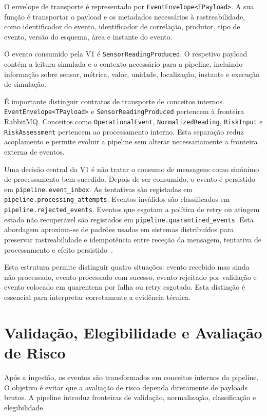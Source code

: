 O envelope de transporte é representado por \texttt{EventEnvelope<TPayload>}. A sua função é transportar o payload e os metadados necessários à rastreabilidade, como identificador do evento, identificador de correlação, produtor, tipo de evento, versão do esquema, área e instante do evento.

O evento consumido pela V1 é \texttt{SensorReadingProduced}. O respetivo payload contém a leitura simulada e o contexto necessário para a pipeline, incluindo informação sobre sensor, métrica, valor, unidade, localização, instante e execução de simulação.

É importante distinguir contratos de transporte de conceitos internos. \texttt{EventEnvelope<TPayload>} e \texttt{SensorReadingProduced} pertencem à fronteira RabbitMQ. Conceitos como \texttt{OperationalEvent}, \texttt{NormalizedReading}, \texttt{RiskInput} e \texttt{RiskAssessment} pertencem ao processamento interno. Esta separação reduz acoplamento e permite evoluir a pipeline sem alterar necessariamente a fronteira externa de eventos.

Uma decisão central da V1 é não tratar o consumo de mensagens como sinónimo de processamento bem-sucedido. Depois de ser consumido, o evento é persistido em \texttt{pipeline.event\_inbox}. As tentativas são registadas em \texttt{pipeline.processing\_attempts}. Eventos inválidos são classificados em \texttt{pipeline.rejected\_events}. Eventos que esgotam a política de retry ou atingem estado não recuperável são registados em \texttt{pipeline.quarantined\_events}. Esta abordagem aproxima-se de padrões usados em sistemas distribuídos para preservar rastreabilidade e idempotência entre receção da mensagem, tentativa de processamento e efeito persistido~\citep{richardson_idempotent_consumer,richardson_transactional_outbox}.

Esta estrutura permite distinguir quatro situações: evento recebido mas ainda não processado, evento processado com sucesso, evento rejeitado por validação e evento colocado em quarentena por falha ou retry esgotado. Esta distinção é essencial para interpretar corretamente a evidência técnica.

\section{Validação, Elegibilidade e Avaliação de Risco}

Após a ingestão, os eventos são transformados em conceitos internos da pipeline. O objetivo é evitar que a avaliação de risco dependa diretamente de payloads brutos. A pipeline introduz fronteiras de validação, normalização, classificação e elegibilidade.

